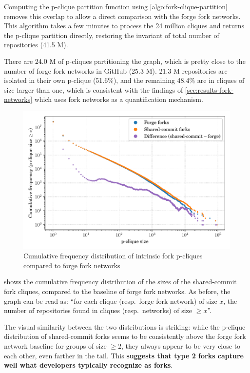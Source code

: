 Computing the p-clique partition function using
\cref{algo:fork-clique-partition} removes this overlap to allow a direct
comparison with the forge fork networks. This algorithm takes a few minutes to
process the 24 million cliques and returns the p-clique partition directly,
restoring the invariant of total number of repositories (41.5 M).

There are 24.0 M of p-cliques partitioning the graph, which is pretty close to
the number of forge fork networks in GitHub (25.3 M).
21.3 M repositories are isolated in their own p-clique (51.6\%), and the
remaining 48.4\% are in cliques of size larger than one, which is consistent
with the findings of \cref{sec:results-fork-networks} which uses fork
networks as a quantification mechanism.

\begin{figure}[t]
    \centering
    \includegraphics[width=0.8\linewidth]{img/forks/fork-clique-partition-freq-distribution.pdf}
    \caption{Cumulative frequency distribution of intrinsic fork p-cliques
    compared to forge fork networks}%
    \label{fig:fork-clique-freq-distrib}
\end{figure}

 shows the cumulative frequency
distribution of the sizes of the shared-commit fork cliques, compared to the
baseline of forge fork networks. As before, the graph can be read as: ``for
each clique (resp.\ forge fork network) of size $x$, the number
of repositories found in cliques (resp.\ networks) of size $\geq x$''.

The visual similarity between the two distributions is striking: while the
p-clique distribution of shared-commit forks seems to be consistently above the
forge fork network baseline for groups of size $\geq 2$, they always appear to
be very close to each other, even farther in the tail. This \textbf{suggests
that type 2 forks capture well what developers typically recognize as forks}.

